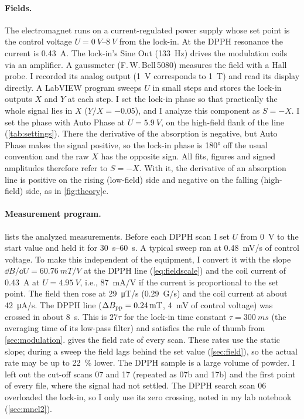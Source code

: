 \paragraph{Fields.}
The electromagnet runs on a current-regulated power supply whose set point is the control voltage
$U=\qtyrange{0}{8}{V}$ from the lock-in. At the DPPH resonance the current is \qty{0.43}{A}. The lock-in's Sine Out
(\qty{133}{Hz}) drives the modulation coils via an amplifier. A gaussmeter (F.\,W.\,Bell\,5080) measures the field
with a Hall probe. I recorded its analog output (\qty{1}{V} corresponds to \qty{1}{T}) and read its display directly. A LabVIEW
program sweeps $U$ in small steps and stores the lock-in outputs $X$ and $Y$ at each step. I set the lock-in phase so
that practically the whole signal lies in $X$ ($Y/X=\num{-0.05}$), and I analyze this component as $S=-X$. I set the
phase with Auto Phase at
$U=\qty{5.9}{V}$, on the high-field flank of the  line (\cref{tab:settings}). There the derivative of the
absorption is negative, but Auto Phase makes the signal positive, so the lock-in phase is \ang{180} off the usual
convention and the raw $X$ has the opposite sign. All fits, figures and signed amplitudes therefore refer to $S=-X$. With it, the derivative of an
absorption line is positive on the rising (low-field) side and negative on the falling (high-field) side, as in
\cref{fig:theory}c.

\paragraph{Measurement program.}
 lists the analyzed measurements. Before each DPPH scan I set $U$ from \qty{0}{V} to the start value
and held it for \qtyrange{30}{60}{s}. A typical sweep ran at \qty{0.48}{mV/s} of control voltage. To make this independent of the equipment, I convert it
with the slope $\dd B/\dd U=\qty{60.76}{mT/V}$ at the DPPH line (\cref{eq:fieldscale}) and the coil current of
\qty{0.43}{A} at $U=\qty{4.95}{V}$, i.e., \qty{87}{mA/V} if the current is proportional to the set point. The field
then rose at \qty{29}{\micro T/s} (\qty{0.29}{G/s}) and the coil current at about
\qty{42}{\micro A/s}. The DPPH line ($\Delta B_\mathrm{pp}=\qty{0.24}{mT}$, \qty{4}{mV} of control voltage) was crossed in about
\qty{8}{s}. This is $27\tau$ for the lock-in time constant $\tau=\qty{300}{ms}$ (the averaging time of its low-pass
filter) and satisfies the rule of thumb from \cref{sec:modulation}.  gives the field rate of every
scan. These rates use the static slope; during a sweep the field lags behind the set value (\cref{sec:field}), so the
actual rate may be up to \qty{22}{\percent} lower. The DPPH sample is a large
volume of powder. I left out the cut-off scans 07 and 17 (repeated as 07b and 17b) and the first point of every file,
where the signal had not settled. The DPPH search scan 06 overloaded the lock-in, so I only use its zero
crossing, noted in my lab notebook (\cref{sec:mncl2}).

